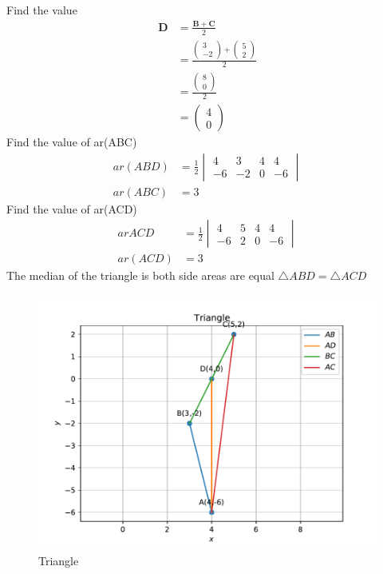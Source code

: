 \documentclass[12pt]{article}
\newcommand{\myvec}[1]{\ensuremath{\begin{pmatrix}#1\end{pmatrix}}}
\let\vec\mathbf
\begin{document}
Find the value
\begin{align}
\vec{D}&=\frac{\vec{B}+\vec{C}}{2}\\
&=\frac{\myvec{3\\ -2}+\myvec{5\\ 2}}{2}\\
&=\frac{\myvec{8\\ 0}}{2}\\
&=\myvec{4\\ 0}
\end{align}
Find the value of ar(ABC)
\begin{align}
ar(ABD)&=\frac{1}{2}\begin{vmatrix}
4 &3 &4 &4 \\
-6 &-2 &0 &-6
\end{vmatrix}\\
ar(ABC)&=3
\end{align}
Find the value of ar(ACD)
\begin{align}
ar ACD&=\frac{1}{2}\begin{vmatrix}
4 &5 &4 &4 \\
-6 &2 &0 &-6
\end{vmatrix}\\
ar(ACD)&=3
\end{align}
The median of the triangle is  both side areas are equal $\triangle ABD=\triangle ACD$
\begin{figure}[h]
\centering
\includegraphics[width=\columnwidth]{fig.pdf}
\caption{Triangle}
\label{fig-}
\end{figure} 
\end{document}
